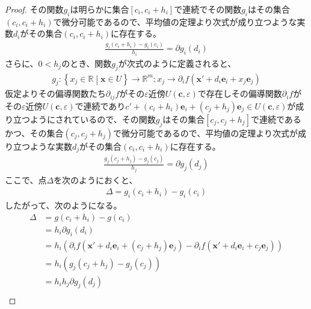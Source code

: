 \documentclass[dvipdfmx]{jsarticle}
\begin{document}
\begin{proof}
その関数$g_{i}$は明らかに集合$\left[ c_{i},c_{i} + h_{i} \right]$で連続でその関数$g_{i}$はその集合$\left( c_{i},c_{i} + h_{i} \right)$で微分可能であるので、平均値の定理より次式が成り立つような実数$d_{i}$がその集合$\left( c_{i},c_{i} + h_{i} \right)$に存在する。
\begin{align*}
\frac{g_{i}\left( c_{i} + h_{i} \right) - g_{i}\left( c_{i} \right)}{h_{i}} = \partial g_{i}\left( d_{i} \right)
\end{align*}
さらに、$0 < h_{j}$のとき、関数$g_{j}$が次式のように定義されると、
\begin{align*}
g_{j}:\left\{ x_{j} \in \mathbb{R} \middle| \mathbf{x} \in U \right\} \rightarrow \mathbb{R}^{m};x_{j} \rightarrow \partial_{i}f\left( \mathbf{x}' + d_{i}\mathbf{e}_{i} + x_{j}\mathbf{e}_{j} \right)
\end{align*}
仮定よりその偏導関数たち$\partial_{ij}f$がその$\varepsilon$近傍$U\left( \mathbf{c},\varepsilon \right)$で存在しその偏導関数$\partial_{i}f$がその$\varepsilon$近傍$U\left( \mathbf{c},\varepsilon \right)$で連続であり$c' + \left( c_{i} + h_{i} \right)\mathbf{e}_{i} + \left( c_{j} + h_{j} \right)\mathbf{e}_{j} \in U\left( \mathbf{c},\varepsilon \right)$が成り立つようにされているので、その関数$g_{j}$はその集合$\left[ c_{j},c_{j} + h_{j} \right]$で連続であるかつ、その集合$\left( c_{j},c_{j} + h_{j} \right)$で微分可能であるので、平均値の定理より次式が成り立つような実数$d_{j}$がその集合$\left( c_{i},c_{i} + h_{i} \right)$に存在する。
\begin{align*}
\frac{g_{j}\left( c_{j} + h_{j} \right) - g_{j}\left( c_{j} \right)}{h_{j}} = \partial g_{j}\left( d_{j} \right)
\end{align*}
ここで、点$\varDelta$を次のようにおくと、
\begin{align*}
\varDelta = g_{i}\left( c_{i} + h_{i} \right) - g_{i}\left( c_{i} \right)
\end{align*}
したがって、次のようになる。
\begin{align*}
\varDelta &= g\left( c_{i} + h_{i} \right) - g\left( c_{i} \right)\\
&= h_{i}\partial g_{i}\left( d_{i} \right)\\
&= h_{i}\left( \partial_{i}f\left( \mathbf{x}' + d_{i}\mathbf{e}_{i} + \left( c_{j} + h_{j} \right)\mathbf{e}_{j} \right) - \partial_{i}f\left( \mathbf{x}' + d_{i}\mathbf{e}_{i} + c_{j}\mathbf{e}_{j} \right) \right)\\
&= h_{i}\left( g_{j}\left( c_{j} + h_{j} \right) - g_{j}\left( c_{j} \right) \right)\\
&= h_{i}h_{j}\partial g_{j}\left( d_{j} \right)\\

\end{align*}
\end{proof}
\end{document}
